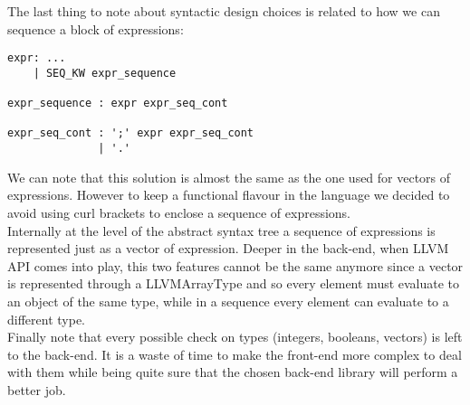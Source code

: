 \documentclass[11pt]{article}
\begin{document}
The last thing to note about syntactic design choices is related to how we can sequence a block of expressions:
\begin{verbatim}
expr: ...
    | SEQ_KW expr_sequence

expr_sequence : expr expr_seq_cont

expr_seq_cont : ';' expr expr_seq_cont
              | '.'                   
\end{verbatim}{}
We can note that this solution is almost the same as the one used for vectors of expressions. However to keep a functional flavour in the language we decided to avoid using curl brackets to enclose a sequence of expressions.\\

Internally at the level of the abstract syntax tree a sequence of expressions is represented just as a vector of expression. Deeper in the back-end, when LLVM API comes into play, this two features cannot be the same anymore since a vector is represented through a LLVMArrayType and so every element must evaluate to an object of the same type, while in a sequence every element can evaluate to a different type.
\\
Finally note that every possible check on types (integers, booleans, vectors) is left to the back-end. It is a waste of time to make the front-end more complex to deal with them while being quite sure that the chosen back-end library will perform a better job.
\end{document}
